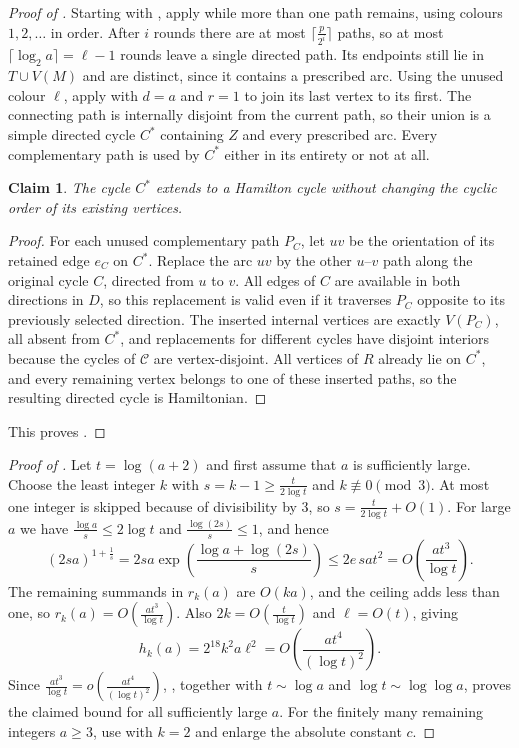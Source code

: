 \documentclass[11pt,a4paper]{article}
\newtheorem{claim}{Claim}
\theoremstyle{remark}
\numberwithin{equation}{section}
\newcommand{\calC}{\mathcal{C}}
\begin{document}
\begin{proof}[Proof of ]
		Starting with , apply  while more than one path remains,
		using colours $1,2,\ldots$ in order.
		After $i$ rounds there are at most $\lceil \frac{p}{2^i}\rceil$ paths, so at most $\lceil\log_2 a\rceil=\ell-1$ rounds leave a single directed path.
		Its endpoints still lie in $T\cup V(M)$ and are distinct, since it contains a prescribed arc.
		Using the unused colour $\ell$, apply  with $d=a$ and $r=1$ to join its
		last vertex to its first.
		The connecting path is internally disjoint from the current path, so their union is a simple
		directed cycle $C^*$ containing $Z$ and every prescribed arc.
		Every complementary path is used by $C^*$ either in its entirety or not at all.
		\begin{claim}\label{cl:extension}
			The cycle $C^*$ extends to a Hamilton cycle without changing the cyclic order of its existing vertices.
		\end{claim}
		\begin{proof}
			For each unused complementary path $P_C$, let $uv$ be the orientation of its retained edge $e_C$ on $C^*$.
			Replace the arc $uv$ by the other $u$--$v$ path along the original cycle $C$, directed from $u$ to $v$.
			All edges of $C$ are available in both directions in $D$, so this replacement is valid even if it
			traverses $P_C$ opposite to its previously selected direction.
			The inserted internal vertices are exactly $V(P_C)$, all absent from $C^*$, and replacements for
			different cycles have disjoint interiors because the cycles of $\calC$ are vertex-disjoint.
			All vertices of $R$ already lie on $C^*$, and every remaining vertex belongs to one of these inserted
			paths, so the resulting directed cycle is Hamiltonian.
		\end{proof}
		This proves .
	\end{proof}
	\begin{proof}[Proof of ]
		Let $t=\log(a+2)$ and first assume that $a$ is sufficiently large.
		Choose the least integer $k$ with $s=k-1\ge \frac{t}{2\log t}$ and $k\not\equiv0\pmod{3}$.
		At most one integer is skipped because of divisibility by $3$, so $s=\frac{t}{2\log t}+O(1)$.
		For large $a$ we have $\frac{\log a}{s}\le2\log t$ and $\frac{\log(2s)}{s}\le1$, and hence
		\[
		(2sa)^{1+\frac{1}{s}}
		=2sa\exp\left(\frac{\log a+\log(2s)}s\right)
		\le2e\,sat^2
		=O\left(\frac{at^3}{\log t}\right).
		\]
		The remaining summands in $r_k(a)$ are $O(ka)$, and the ceiling adds less than one, so
		$r_k(a)=O(\frac{at^3}{\log t})$.
		Also $2k=O(\frac{t}{\log t})$ and $\ell=O(t)$, giving
		\[
		h_k(a)=2^{18}k^2a\ell^2
		=O\left(\frac{at^4}{(\log t)^2}\right).
		\]
		Since $\frac{at^3}{\log t}=o(\frac{at^4}{(\log t)^2})$, , together with
		$t\sim\log a$ and $\log t\sim\log\log a$, proves the
		claimed bound for all sufficiently large $a$.
		For the finitely many remaining integers $a\ge3$, use  with $k=2$ and
		enlarge the absolute constant $c$.
	\end{proof}
\end{document}
